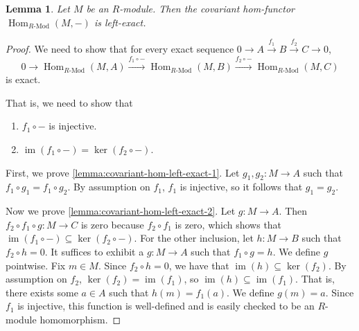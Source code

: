 \documentclass[11pt]{article}
\newcommand{\Hom}{\operatorname{Hom}}
\newcommand{\RHom}[3]{\Hom_{{#1}\text{-Mod}}({#2}, {#3})}
\newcommand{\im}{\operatorname{im}}
\renewcommand{\ker}{\operatorname{ker}}
\theoremstyle{plain}
\newtheorem{lemma}{Lemma}[section]
\theoremstyle{definition}
\begin{document}
\begin{lemma}\label{lemma:covariant-hom-left-exact}
  Let \(M\) be an \(R\)-module. Then the covariant hom-functor \(\RHom{R}{M}{-}\) is left-exact.
\end{lemma}

\begin{proof}
  We need to show that for every exact sequence \(0 \to A \overset{f_1}{\to} B \overset{f_2}{\to} C \to 0\),
  \[0 \to \RHom{R}{M}{A} \overset{f_1 \circ -}{\to} \RHom{R}{M}{B} \overset{f_2 \circ -}{\to} \RHom{R}{M}{C}\]
  is exact.

  That is, we need to show that
  \begin{enumerate}
  \item \label{lemma:covariant-hom-left-exact-1}\(f_1 \circ -\) is injective.
  \item \label{lemma:covariant-hom-left-exact-2} \(\im(f_1 \circ -) = \ker(f_2 \circ -)\).
  \end{enumerate}

First, we prove  \ref{lemma:covariant-hom-left-exact-1}.
    Let \(g_1, g_2 : M \to A\) such that \(f_1 \circ g_1 = f_1 \circ g_2\). By assumption on \(f_1\), \(f_1\) is injective, so it follows that \(g_1 = g_2\).

Now we prove \ref{lemma:covariant-hom-left-exact-2}.
    Let \(g : M \to A\). Then \(f_2 \circ f_1 \circ g : M \to C\) is zero because \(f_2 \circ f_1\) is zero, which shows that \(\im(f_1 \circ -) \subseteq \ker(f_2 \circ -)\). For the other inclusion, let \(h : M \to B\)  such that \(f_2 \circ h = 0\). It suffices to exhibit a \(g : M \to A\) such that \(f_1 \circ g = h\). We define \(g\) pointwise. Fix \(m \in M\). Since \(f_2 \circ h = 0\), we have that \(\im(h) \subseteq \ker(f_2)\). By assumption on \(f_2\), \(\ker(f_2) = \im(f_1)\), so \(\im(h) \subseteq \im(f_1)\). That is, there exists some \(a \in A\) such that \(h(m) = f_1(a)\). We define \(g(m) = a\). Since \(f_1\) is injective, this function is well-defined and is easily checked to be an \(R\)-module homomorphism.

  \end{proof}
\end{document}
